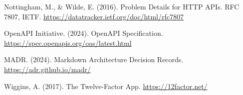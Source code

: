 Nottingham, M., \& Wilde, E. (2016). Problem Details for HTTP APIs. RFC 7807, IETF. \url{https://datatracker.ietf.org/doc/html/rfc7807}

OpenAPI Initiative. (2024). OpenAPI Specification. \url{https://spec.openapis.org/oas/latest.html}


MADR. (2024). Markdown Architecture Decision Records. \url{https://adr.github.io/madr/}

Wiggins, A. (2017). The Twelve-Factor App. \url{https://12factor.net/}


